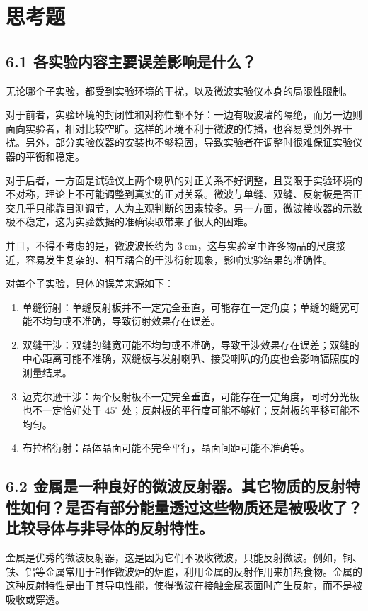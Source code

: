 \documentclass[UTF8]{article}
\theoremstyle{MyLineTheoremStyle} %
\theoremstyle{MyBlockTheoremStyle} %
\theoremstyle{MySubsubsectionStyle} %
\begin{document}
\section{思考题}

\subsection*{6.1 各实验内容主要误差影响是什么？}

无论哪个子实验，都受到实验环境的干扰，以及微波实验仪本身的局限性限制。

对于前者，实验环境的封闭性和对称性都不好：一边有吸波墙的隔绝，而另一边则面向实验者，相对比较空旷。这样的环境不利于微波的传播，也容易受到外界干扰。另外，部分实验仪器的安装也不够稳固，导致实验者在调整时很难保证实验仪器的平衡和稳定。

对于后者，一方面是试验仪上两个喇叭的对正关系不好调整，且受限于实验环境的不对称，理论上不可能调整到真实的正对关系。微波与单缝、双缝、反射板是否正交几乎只能靠目测调节，人为主观判断的因素较多。另一方面，微波接收器的示数极不稳定，这为实验数据的准确读取带来了很大的困难。

并且，不得不考虑的是，微波波长约为 $3 \ \mathrm{cm}$，这与实验室中许多物品的尺度接近，容易发生复杂的、相互耦合的干涉衍射现象，影响实验结果的准确性。

\noindent 对每个子实验，具体的误差来源如下：
\begin{enumerate}
\item 单缝衍射：单缝反射板并不一定完全垂直，可能存在一定角度；单缝的缝宽可能不均匀或不准确，导致衍射效果存在误差。
\item 双缝干涉：双缝的缝宽可能不均匀或不准确，导致干涉效果存在误差；双缝的中心距离可能不准确，双缝板与发射喇叭、接受喇叭的角度也会影响辐照度的测量结果。
\item 迈克尔逊干涉：两个反射板不一定完全垂直，可能存在一定角度，同时分光板也不一定恰好处于 $45^\circ$ 处；反射板的平行度可能不够好；反射板的平移可能不均匀。
\item 布拉格衍射：晶体晶面可能不完全平行，晶面间距可能不准确等。
\end{enumerate}

\subsection*{6.2 金属是一种良好的微波反射器。其它物质的反射特性如何？是否有部分能量透过这些物质还是被吸收了？比较导体与非导体的反射特性。}
金属是优秀的微波反射器，这是因为它们不吸收微波，只能反射微波。例如，铜、铁、铝等金属常用于制作微波炉的炉膛，利用金属的反射作用来加热食物。金属的这种反射特性是由于其导电性能，使得微波在接触金属表面时产生反射，而不是被吸收或穿透。
\end{document}
